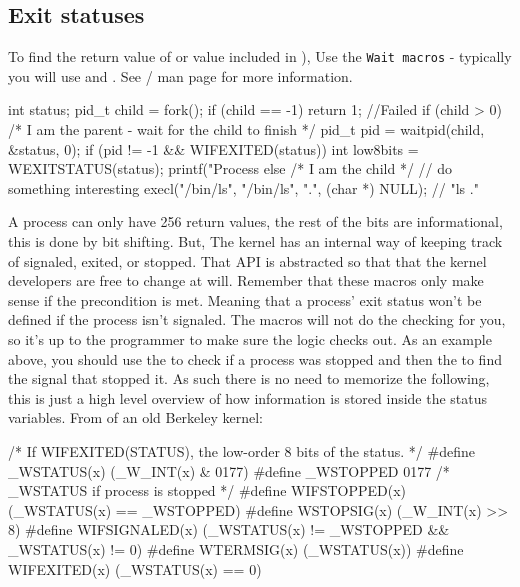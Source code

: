 \subsection{Exit statuses}

To find the return value of  or value included in ), Use the \texttt{Wait macros} - typically you will use  and  . See / man page for more information.

\begin{code}[language=C][language=C]
int status;
pid_t child = fork();
if (child == -1) return 1; //Failed
if (child > 0) { /* I am the parent - wait for the child to finish */
  pid_t pid = waitpid(child, &status, 0);
  if (pid != -1 && WIFEXITED(status)) {
     int low8bits = WEXITSTATUS(status);
     printf("Process %
  }
} else { /* I am the child */
 // do something interesting
  execl("/bin/ls", "/bin/ls", ".", (char *) NULL); // "ls ."
}
\end{code}

A process can only have 256 return values, the rest of the bits are informational, this is done by bit shifting. But, The kernel has an internal way of keeping track of signaled, exited, or stopped. That API is abstracted so that that the kernel developers are free to change at will. Remember that these macros only make sense if the precondition is met. Meaning that a process' exit status won't be defined if the process isn't signaled. The macros will not do the checking for you, so it's up to the programmer to make sure the logic checks out. As an example above, you should use the  to check if a process was stopped and then the  to find the signal that stopped it. As such there is no need to memorize the following, this is just a high level overview of how information is stored inside the status variables. From  of an old Berkeley kernel\cite{sys/wait.h}:

\begin{code}[language=C][language=C]
/* If WIFEXITED(STATUS), the low-order 8 bits of the status. */
#define _WSTATUS(x) (_W_INT(x) & 0177)
#define _WSTOPPED 0177    /* _WSTATUS if process is stopped */
#define WIFSTOPPED(x) (_WSTATUS(x) == _WSTOPPED)
#define WSTOPSIG(x) (_W_INT(x) >> 8)
#define WIFSIGNALED(x)  (_WSTATUS(x) != _WSTOPPED && _WSTATUS(x) != 0)
#define WTERMSIG(x) (_WSTATUS(x))
#define WIFEXITED(x)  (_WSTATUS(x) == 0)
\end{code}

